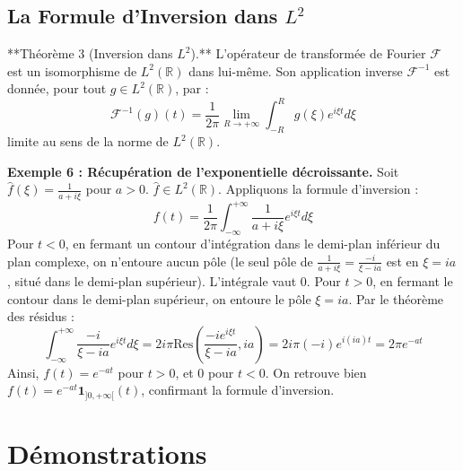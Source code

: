 \documentclass[11pt,a4paper]{article}
\begin{document}
\subsection{La Formule d'Inversion dans $L^2$}

**Théorème 3 (Inversion dans $L^2$).**
L'opérateur de transformée de Fourier $\mathcal{F}$ est un isomorphisme de $L^2(\mathbb{R})$ dans lui-même. Son application inverse $\mathcal{F}^{-1}$ est donnée, pour tout $g \in L^2(\mathbb{R})$, par :
$$ \mathcal{F}^{-1}(g)(t) = \frac{1}{2\pi} \lim_{R \to +\infty} \int_{-R}^{R} g(\xi) e^{i\xi t} d\xi $$
limite au sens de la norme de $L^2(\mathbb{R})$.

\textbf{Exemple 6 : Récupération de l'exponentielle décroissante.}
Soit $\hat{f}(\xi) = \frac{1}{a+i\xi}$ pour $a>0$. $\hat{f} \in L^2(\mathbb{R})$.
Appliquons la formule d'inversion :
$$ f(t) = \frac{1}{2\pi} \int_{-\infty}^{+\infty} \frac{1}{a+i\xi} e^{i\xi t} d\xi $$
Pour $t < 0$, en fermant un contour d'intégration dans le demi-plan inférieur du plan complexe, on n'entoure aucun pôle (le seul pôle de $\frac{1}{a+i\xi} = \frac{-i}{\xi-ia}$ est en $\xi = ia$, situé dans le demi-plan supérieur). L'intégrale vaut 0.
Pour $t > 0$, en fermant le contour dans le demi-plan supérieur, on entoure le pôle $\xi = ia$. Par le théorème des résidus :
$$ \int_{-\infty}^{+\infty} \frac{-i}{\xi-ia} e^{i\xi t} d\xi = 2i\pi \text{Res}\left( \frac{-i e^{i\xi t}}{\xi-ia}, ia \right) = 2i\pi (-i) e^{i(ia)t} = 2\pi e^{-at} $$
Ainsi, $f(t) = e^{-at}$ pour $t>0$, et 0 pour $t<0$. On retrouve bien $f(t) = e^{-at} \mathbf{1}_{]0, +\infty[}(t)$, confirmant la formule d'inversion.

\section{Démonstrations}
\end{document}
